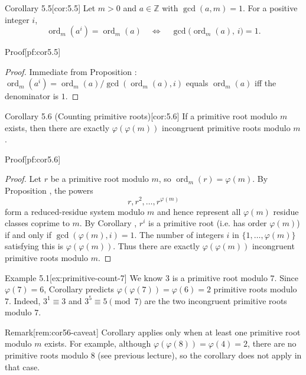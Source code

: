 \documentclass[10pt]{article}
\theoremstyle{definition}
\theoremstyle{plain}
\numberwithin{equation}{section}
\begin{document}
\begin{define}{Corollary 5.5}[cor:5.5]
Let $m>0$ and $a\in\mathbb{Z}$ with $\gcd(a,m)=1$. For a positive integer $i$,
\[
\operatorname{ord}_m(a^i)=\operatorname{ord}_m(a) \quad\Longleftrightarrow\quad \gcd\bigl(\operatorname{ord}_m(a),\,i\bigr)=1.
\]
\end{define}

\begin{define}{Proof}[pf:cor5.5]
\begin{proof}
Immediate from Proposition : $\operatorname{ord}_m(a^i)=\operatorname{ord}_m(a)/\gcd(\operatorname{ord}_m(a),i)$ equals $\operatorname{ord}_m(a)$ iff the denominator is $1$.
\end{proof}
\end{define}

\begin{define}{Corollary 5.6 (Counting primitive roots)}[cor:5.6]
If a primitive root modulo $m$ exists, then there are exactly $\varphi(\varphi(m))$ incongruent primitive roots modulo $m$.
\end{define}

\begin{define}{Proof}[pf:cor5.6]
\begin{proof}
Let $r$ be a primitive root modulo $m$, so $\operatorname{ord}_m(r)=\varphi(m)$. By Proposition , the powers
\[
r, r^2, \dots, r^{\varphi(m)}
\]
form a reduced-residue system modulo $m$ and hence represent all $\varphi(m)$ residue classes coprime to $m$. By Corollary , $r^i$ is a primitive root (i.e. has order $\varphi(m)$) if and only if $\gcd(\varphi(m),i)=1$. The number of integers $i$ in $\{1,\dots,\varphi(m)\}$ satisfying this is $\varphi(\varphi(m))$. Thus there are exactly $\varphi(\varphi(m))$ incongruent primitive roots modulo $m$.
\end{proof}
\end{define}

\begin{define}{Example 5.1}[ex:primitive-count-7]
We know $3$ is a primitive root modulo $7$. Since $\varphi(7)=6$, Corollary  predicts $\varphi(\varphi(7))=\varphi(6)=2$ primitive roots modulo $7$. Indeed, $3^1\equiv 3$ and $3^5\equiv 5\pmod 7$ are the two incongruent primitive roots modulo $7$.
\end{define}

\begin{define}{Remark}[rem:cor56-caveat]
Corollary  applies only when at least one primitive root modulo $m$ exists. For example, although $\varphi(\varphi(8))=\varphi(4)=2$, there are no primitive roots modulo $8$ (see previous lecture), so the corollary does not apply in that case.
\end{define}
\end{document}
